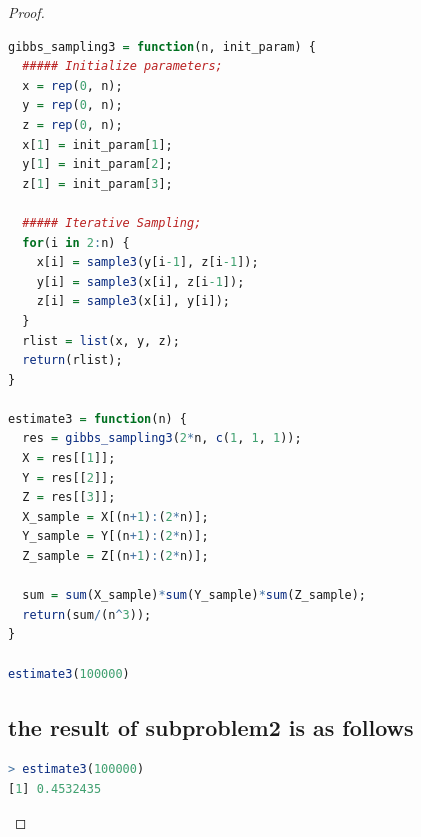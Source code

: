 \documentclass{article}
\begin{document}
\begin{proof}
\begin{lstlisting}[language = {R}]
gibbs_sampling3 = function(n, init_param) {
  ##### Initialize parameters;
  x = rep(0, n);
  y = rep(0, n);
  z = rep(0, n);
  x[1] = init_param[1];
  y[1] = init_param[2];
  z[1] = init_param[3];
  
  ##### Iterative Sampling;
  for(i in 2:n) {
    x[i] = sample3(y[i-1], z[i-1]);
    y[i] = sample3(x[i], z[i-1]);
    z[i] = sample3(x[i], y[i]);
  }
  rlist = list(x, y, z);
  return(rlist);
}

estimate3 = function(n) {
  res = gibbs_sampling3(2*n, c(1, 1, 1));
  X = res[[1]];
  Y = res[[2]];
  Z = res[[3]];
  X_sample = X[(n+1):(2*n)];
  Y_sample = Y[(n+1):(2*n)];
  Z_sample = Z[(n+1):(2*n)];

  sum = sum(X_sample)*sum(Y_sample)*sum(Z_sample);
  return(sum/(n^3));
}

estimate3(100000)
\end{lstlisting}
\subsection{the result of subproblem2 is as follows}
\begin{lstlisting}[language = {R}]
> estimate3(100000)
[1] 0.4532435
\end{lstlisting}
\end{proof}
\end{document}
